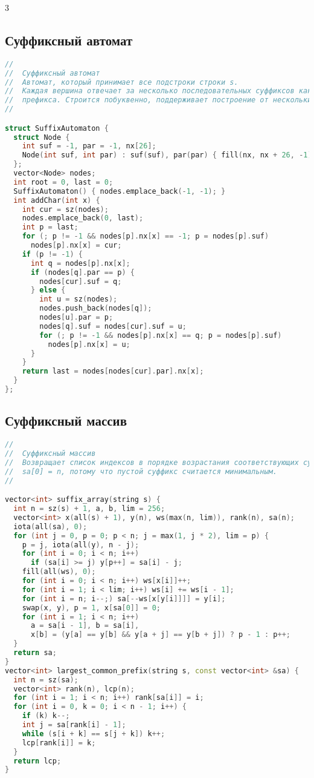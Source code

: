 \documentclass[10pt,a4paper,landscape,twosided]{extarticle}
\begin{document}
\begin{multicols}{3}
\subsection{Суффиксный автомат}
\begin{lstlisting}[language=C++]
//
//  Суффиксный автомат
//  Автомат, который принимает все подстроки строки s.
//  Каждая вершина отвечает за несколько последовательных суффиксов какого-то
//  префикса. Строится побуквенно, поддерживает построение от нескольких строк.
//

struct SuffixAutomaton {
  struct Node {
    int suf = -1, par = -1, nx[26];
    Node(int suf, int par) : suf(suf), par(par) { fill(nx, nx + 26, -1); }
  };
  vector<Node> nodes;
  int root = 0, last = 0;
  SuffixAutomaton() { nodes.emplace_back(-1, -1); }
  int addChar(int x) {
    int cur = sz(nodes);
    nodes.emplace_back(0, last);
    int p = last;
    for (; p != -1 && nodes[p].nx[x] == -1; p = nodes[p].suf)
      nodes[p].nx[x] = cur;
    if (p != -1) {
      int q = nodes[p].nx[x];
      if (nodes[q].par == p) {
        nodes[cur].suf = q;
      } else {
        int u = sz(nodes);
        nodes.push_back(nodes[q]);
        nodes[u].par = p;
        nodes[q].suf = nodes[cur].suf = u;
        for (; p != -1 && nodes[p].nx[x] == q; p = nodes[p].suf)
          nodes[p].nx[x] = u;
      }
    }
    return last = nodes[nodes[cur].par].nx[x];
  }
};
\end{lstlisting}

\subsection{Суффиксный массив}
\begin{lstlisting}[language=C++]
//
//  Суффиксный массив
//  Возвращает список индексов в порядке возрастания соответствующих суффиксов.
//  sa[0] = n, потому что пустой суффикс считается минимальным.
//

vector<int> suffix_array(string s) {
  int n = sz(s) + 1, a, b, lim = 256;
  vector<int> x(all(s) + 1), y(n), ws(max(n, lim)), rank(n), sa(n);
  iota(all(sa), 0);
  for (int j = 0, p = 0; p < n; j = max(1, j * 2), lim = p) {
    p = j, iota(all(y), n - j);
    for (int i = 0; i < n; i++)
      if (sa[i] >= j) y[p++] = sa[i] - j;
    fill(all(ws), 0);
    for (int i = 0; i < n; i++) ws[x[i]]++;
    for (int i = 1; i < lim; i++) ws[i] += ws[i - 1];
    for (int i = n; i--;) sa[--ws[x[y[i]]]] = y[i];
    swap(x, y), p = 1, x[sa[0]] = 0;
    for (int i = 1; i < n; i++)
      a = sa[i - 1], b = sa[i],
      x[b] = (y[a] == y[b] && y[a + j] == y[b + j]) ? p - 1 : p++;
  }
  return sa;
}
vector<int> largest_common_prefix(string s, const vector<int> &sa) {
  int n = sz(sa);
  vector<int> rank(n), lcp(n);
  for (int i = 1; i < n; i++) rank[sa[i]] = i;
  for (int i = 0, k = 0; i < n - 1; i++) {
    if (k) k--;
    int j = sa[rank[i] - 1];
    while (s[i + k] == s[j + k]) k++;
    lcp[rank[i]] = k;
  }
  return lcp;
}
\end{lstlisting}


\end{multicols}
\end{document}
